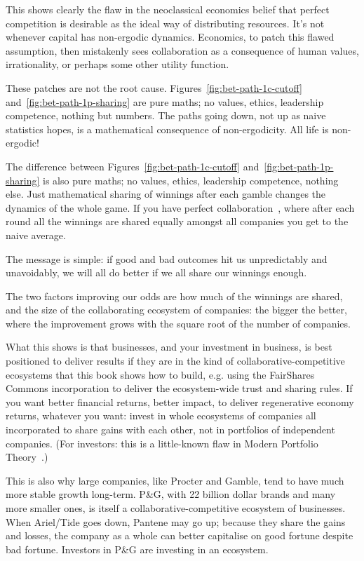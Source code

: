This shows clearly the flaw in the neoclassical economics  belief that perfect competition is desirable as the ideal way of distributing resources. It’s not whenever capital has non-ergodic dynamics. Economics, to patch this flawed assumption,  then mistakenly sees collaboration as a consequence of human values, irrationality, or perhaps some other utility function. 


These patches are not the root cause. Figures~\ref{fig:bet-path-1c-cutoff} and~\ref{fig:bet-path-1p-sharing} are pure maths; no values, ethics, leadership competence, nothing but numbers. The paths going down, not up as naive statistics hopes, is a mathematical consequence of non-ergodicity. All life is non-ergodic!


The difference between Figures~\ref{fig:bet-path-1c-cutoff} and~\ref{fig:bet-path-1p-sharing} is also pure maths; no values, ethics, leadership competence, nothing else. Just mathematical sharing of winnings after each gamble changes the dynamics of the whole game. If you have perfect collaboration~\cite{peters-adamou-evolutionary}, where after each round all the winnings are shared equally amongst all companies you get to the naive average.


The message is simple: if good and bad outcomes hit us unpredictably and unavoidably, we will all do better if we all share our winnings enough. 


The two factors improving our odds are how much of the winnings are shared, and the size of the collaborating ecosystem of companies: the bigger the better, where the improvement grows with the square root of the number of companies. 


What this shows is that businesses, and your investment in business, is best positioned to deliver results if they are in the kind of collaborative-competitive ecosystems that this book shows how to build, e.g. using the FairShares Commons incorporation to deliver the ecosystem-wide trust and sharing rules. If you want better financial returns, better impact, to deliver regenerative economy returns, whatever you want: invest in whole ecosystems of companies all incorporated to share gains with each other, not in portfolios of independent companies. (For investors: this is a little-known flaw in Modern Portfolio Theory~\cite{boyd-lines-dots}.)


This is also why large companies, like Procter and Gamble, tend to have much more stable growth long-term. P\&G, with 22 billion dollar brands and many more smaller ones, is itself a collaborative-competitive ecosystem of businesses. When Ariel/Tide goes down, Pantene may go up; because they share the gains and losses, the company as a whole can better capitalise on good fortune despite bad fortune. Investors in P\&G are investing in an ecosystem\cite{Lucky}.


